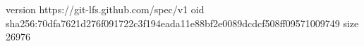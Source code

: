version https://git-lfs.github.com/spec/v1
oid sha256:70dfa7621d276f091722c3f194eada11e88bf2e0089dcdcf508ff09571009749
size 26976
